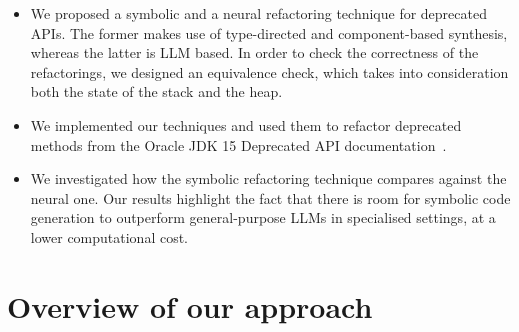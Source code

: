 \documentclass[sigconf,review,anonymous]{acmart}
\begin{document}
\begin{itemize}

\item We proposed a symbolic and a neural refactoring technique for deprecated APIs. The former makes use of type-directed and component-based synthesis, whereas the latter is LLM based. In order to check the correctness of the refactorings, we designed an equivalence check, which takes into consideration both the state of the stack and the heap.


\item We implemented our techniques and used them to refactor deprecated methods from the Oracle
JDK 15 Deprecated API documentation~\cite{OracleJdk15DeprecatedAPI}.

\item We investigated how the symbolic refactoring technique compares against the neural one. %
  Our results highlight the fact that there is room for
symbolic code generation to outperform general-purpose LLMs in specialised settings, at a lower computational cost.


\end{itemize}  


\section{Overview of our approach} \label{sec:overview}
\end{document}
